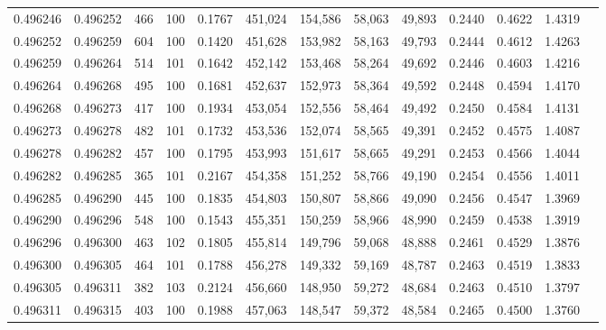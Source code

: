 \begin{tabular}{rrrrrrrrrrrrr}
0.496246 & 0.496252 &   466 & 100 &                                     0.1767 & 451,024 & 154,586 &  58,063 &  49,893 & 0.2440 & 0.4622 & 1.4319 \\
0.496252 & 0.496259 &   604 & 100 &                                     0.1420 & 451,628 & 153,982 &  58,163 &  49,793 & 0.2444 & 0.4612 & 1.4263 \\
0.496259 & 0.496264 &   514 & 101 &                                     0.1642 & 452,142 & 153,468 &  58,264 &  49,692 & 0.2446 & 0.4603 & 1.4216 \\
0.496264 & 0.496268 &   495 & 100 &                                     0.1681 & 452,637 & 152,973 &  58,364 &  49,592 & 0.2448 & 0.4594 & 1.4170 \\
0.496268 & 0.496273 &   417 & 100 &                                     0.1934 & 453,054 & 152,556 &  58,464 &  49,492 & 0.2450 & 0.4584 & 1.4131 \\
0.496273 & 0.496278 &   482 & 101 &                                     0.1732 & 453,536 & 152,074 &  58,565 &  49,391 & 0.2452 & 0.4575 & 1.4087 \\
0.496278 & 0.496282 &   457 & 100 &                                     0.1795 & 453,993 & 151,617 &  58,665 &  49,291 & 0.2453 & 0.4566 & 1.4044 \\
0.496282 & 0.496285 &   365 & 101 &                                     0.2167 & 454,358 & 151,252 &  58,766 &  49,190 & 0.2454 & 0.4556 & 1.4011 \\
0.496285 & 0.496290 &   445 & 100 &                                     0.1835 & 454,803 & 150,807 &  58,866 &  49,090 & 0.2456 & 0.4547 & 1.3969 \\
0.496290 & 0.496296 &   548 & 100 &                                     0.1543 & 455,351 & 150,259 &  58,966 &  48,990 & 0.2459 & 0.4538 & 1.3919 \\
0.496296 & 0.496300 &   463 & 102 &                                     0.1805 & 455,814 & 149,796 &  59,068 &  48,888 & 0.2461 & 0.4529 & 1.3876 \\
0.496300 & 0.496305 &   464 & 101 &                                     0.1788 & 456,278 & 149,332 &  59,169 &  48,787 & 0.2463 & 0.4519 & 1.3833 \\
0.496305 & 0.496311 &   382 & 103 &                                     0.2124 & 456,660 & 148,950 &  59,272 &  48,684 & 0.2463 & 0.4510 & 1.3797 \\
0.496311 & 0.496315 &   403 & 100 &                                     0.1988 & 457,063 & 148,547 &  59,372 &  48,584 & 0.2465 & 0.4500 & 1.3760 \\

\end{tabular}
